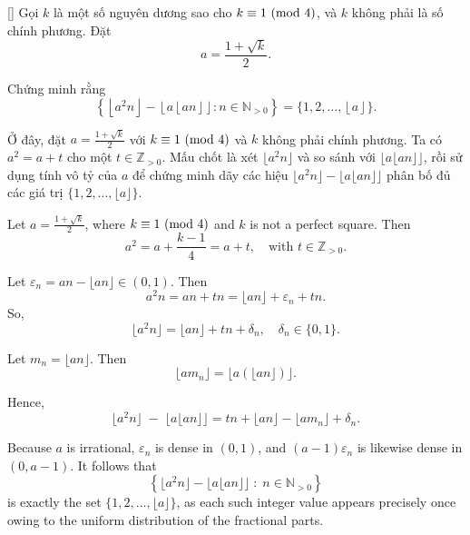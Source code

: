 \documentclass[../03-arithmetic-functions.tex]{subfiles}
\begin{document}
\begin{example*}\label{example:ROU-2015-TST-D1-P4}[\textbf{}]
    Gọi \( k \) là một số nguyên dương sao cho \( k \equiv 1 \ (\mathrm{mod}\ 4) \), và \( k \) không phải là số chính phương. Đặt
    \[
        a = \frac{1 + \sqrt{k}}{2}.
    \]
    
    Chứng minh rằng
    \[
        \left\{ \left\lfloor a^2 n \right\rfloor - \left\lfloor a \left\lfloor a n \right\rfloor \right\rfloor : n \in \mathbb{N}_{>0} \right\} = \{ 1, 2, \ldots, \left\lfloor a \right\rfloor \}.
    \]
\end{example*}

\begin{story*}
    Ở đây, đặt \(a = \tfrac{1 + \sqrt{k}}{2}\) với \(k \equiv 1 \ (\mathrm{mod}\ 4)\) và \(k\) không phải chính phương.
    Ta có \(a^2 = a + t\) cho một \(t \in \mathbb{Z}_{>0}\).
    Mấu chốt là xét \(\lfloor a^2 n \rfloor\) và so sánh với \(\lfloor a \lfloor a n \rfloor \rfloor\),
    rồi sử dụng tính vô tỷ của \(a\) để chứng minh dãy các hiệu \(\lfloor a^2 n \rfloor - \lfloor a \lfloor a n \rfloor\rfloor\)
    phân bố đủ các giá trị \(\{1,2,\dots,\lfloor a\rfloor\}\).
\end{story*}

\bigbreak

\begin{soln}
    Let \( a = \frac{1 + \sqrt{k}}{2} \), where \( k \equiv 1 \ (\mathrm{mod}\ 4) \) and \( k \) is not a perfect square. Then
    \[
        a^2 = a + \frac{k - 1}{4} = a + t, \quad \text{with } t \in \mathbb{Z}_{>0}.
    \]
    
    Let \( \varepsilon_n = a n - \lfloor a n \rfloor \in (0,1) \). Then
    \[
        a^2 n = a n + t n = \lfloor a n \rfloor + \varepsilon_n + t n.
    \]
    So,
    \[
        \lfloor a^2 n \rfloor = \lfloor a n \rfloor + t n + \delta_n, \quad \delta_n \in \{0,1\}.
    \]

    Let \( m_n = \lfloor a n \rfloor \). Then
    \[
        \lfloor a m_n \rfloor = \lfloor a (\lfloor a n \rfloor) \rfloor.
    \]
    
    Hence,
    \[
        \lfloor a^2 n \rfloor \;-\; \lfloor a \lfloor a n \rfloor \rfloor 
        = t n + \lfloor a n \rfloor - \lfloor a m_n \rfloor + \delta_n.
    \]
    
    Because \( a \) is irrational, \( \varepsilon_n \) is dense in \( (0,1) \), and \((a - 1)\varepsilon_n\) is likewise dense in \((0, a - 1)\).  
    It follows that
    \[
        \left\{ 
            \lfloor a^2 n \rfloor - \lfloor a \lfloor a n \rfloor \rfloor 
            \;:\; n \in \mathbb{N}_{>0} 
        \right\}
    \]
    is exactly the set \(\{1, 2, \ldots, \lfloor a \rfloor\}\), as each such integer value appears precisely once owing to the uniform distribution of the fractional parts.
\end{soln}
\end{document}
